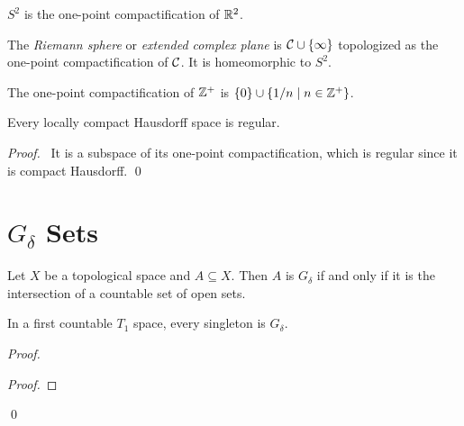 \begin{example}
    $S^2$ is the one-point compactification of $\mathbb{R}^2$.
\end{example}

\begin{definition}
    The \emph{Riemann sphere} or \emph{extended complex plane} is $\mathcal{C} \cup \{ \infty \}$
    topologized as the one-point compactification of $\mathcal{C}$. It is homeomorphic to $S^2$.
\end{definition}

\begin{example}
    The one-point compactification of $\mathbb{Z}^+$ is $\{0\} \cup \{ 1/n \mid n \in \mathbb{Z}^+ \}$.
\end{example}

\begin{proposition}
    Every locally compact Hausdorff space is regular.
\end{proposition}

\begin{proof}
    \pf\ It is a subspace of its one-point compactification, which is regular since
    it is compact Hausdorff. \qed
\end{proof}

\section{$G_\delta$ Sets}

\begin{definition}
    Let $X$ be a topological space and $A \subseteq X$. Then $A$ is \emph{$G_\delta$}
    if and only if it is the intersection of a countable set of open sets.
\end{definition}

\begin{proposition}
    In a first countable $T_1$ space, every singleton is $G_\delta$.
\end{proposition}

\begin{proof}
    \pf
    \begin{proof}
    \end{proof}
    \qed
\end{proof}

